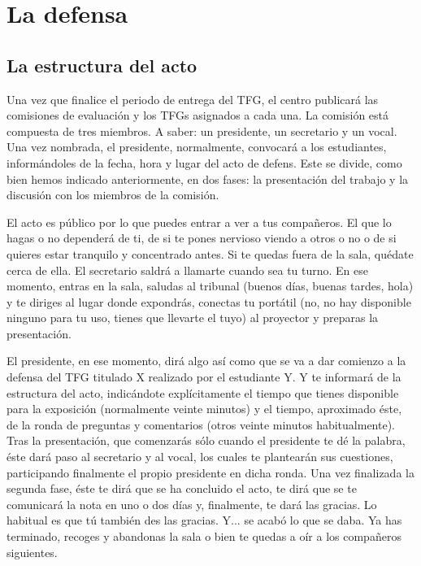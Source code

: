 \chapter{La defensa}
\label{cap:Defensa}

\section{La estructura del acto}

Una vez que finalice el periodo de entrega del TFG, el centro publicará las comisiones de evaluación y los TFGs asignados a cada una. La comisión está compuesta de tres miembros. A saber: un presidente, un secretario y un vocal. Una vez nombrada, el presidente, normalmente, convocará a los estudiantes, informándoles de la fecha, hora y lugar del acto de defens. Este se divide, como bien hemos indicado anteriormente, en dos fases: la presentación del trabajo y la discusión con los miembros de la comisión.

El acto es público por lo que puedes entrar a ver a tus compañeros. El que lo hagas o no dependerá de ti, de si te pones nervioso viendo a otros o no o de si quieres estar tranquilo y concentrado antes. Si te quedas fuera de la sala, quédate cerca de ella. El secretario saldrá a llamarte cuando sea tu turno. En ese momento, entras en la sala, saludas al tribunal (buenos días, buenas tardes, hola) y te diriges al lugar donde expondrás, conectas tu portátil (no, no hay disponible ninguno para tu uso, tienes que llevarte el tuyo) al proyector y preparas la presentación. 

El presidente, en ese momento, dirá algo así como que se va a dar comienzo a la defensa del TFG titulado X realizado por el estudiante Y. Y te informará de la estructura del acto, indicándote explícitamente el tiempo que tienes disponible para la exposición (normalmente veinte minutos) y el tiempo, aproximado éste, de la ronda de preguntas y comentarios (otros veinte minutos habitualmente). Tras la presentación, que comenzarás sólo cuando el presidente te dé la palabra, éste dará paso al secretario y al vocal, los cuales te plantearán sus cuestiones, participando finalmente el propio presidente en dicha ronda. Una vez finalizada la segunda fase, éste te dirá que se ha concluido el acto, te dirá que se te comunicará la nota en uno o dos días y, finalmente, te dará las gracias. Lo habitual es que tú también des las gracias. Y... se acabó lo que se daba. Ya has terminado, recoges y abandonas la sala o bien te quedas a oír a los compañeros siguientes.

